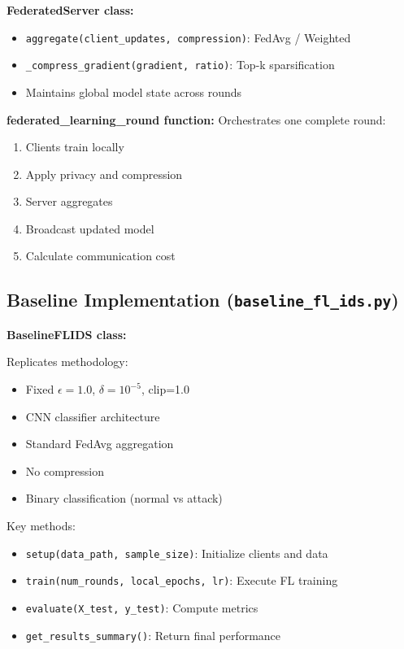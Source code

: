 \textbf{FederatedServer class:}
\begin{itemize}
    \item \texttt{aggregate(client\_updates, compression)}: FedAvg / Weighted
    \item \texttt{\_compress\_gradient(gradient, ratio)}: Top-k sparsification
    \item Maintains global model state across rounds
\end{itemize}

\textbf{federated\_learning\_round function:}
Orchestrates one complete round:
\begin{enumerate}
    \item Clients train locally
    \item Apply privacy and compression
    \item Server aggregates
    \item Broadcast updated model
    \item Calculate communication cost
\end{enumerate}

\subsection{Baseline Implementation (\texttt{baseline\_fl\_ids.py})}

\textbf{BaselineFLIDS class:}

Replicates \citet{saklani2026privacy} methodology:

\begin{itemize}
    \item Fixed $\epsilon=1.0$, $\delta=10^{-5}$, clip=1.0
    \item CNN classifier architecture
    \item Standard FedAvg aggregation
    \item No compression
    \item Binary classification (normal vs attack)
\end{itemize}

Key methods:
\begin{itemize}
    \item \texttt{setup(data\_path, sample\_size)}: Initialize clients and data
    \item \texttt{train(num\_rounds, local\_epochs, lr)}: Execute FL training
    \item \texttt{evaluate(X\_test, y\_test)}: Compute metrics
    \item \texttt{get\_results\_summary()}: Return final performance
\end{itemize}

